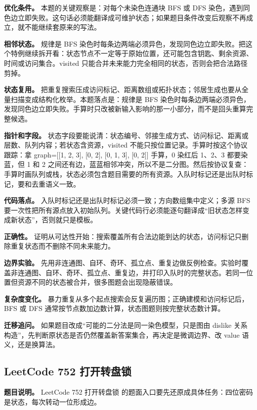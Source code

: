 \textbf{优化条件。} 本题的关键观察是：对每个未染色连通块 BFS 或 DFS 染色，遇到同色边立即失败。这句话必须能翻译成可维护状态；如果题目条件改变后观察不再成立，就不能继续套原来的写法。

\textbf{相邻状态。} 规律是 BFS 染色时每条边两端必须异色，发现同色边立即失败。把这个特例继续拆开看：状态节点不一定等于原始位置，还可能包含钥匙、剩余资源、时间或访问集合。visited 只能合并未来能力完全相同的状态，否则会把合法路径剪掉。

\textbf{状态复用。} 把重复搜索压成访问标记、距离数组或拓扑状态；邻居生成也要从全量扫描变成结构化枚举。本题落点是：规律是 BFS 染色时每条边两端必须异色，发现同色边立即失败。手算时只改被新输入影响的那一小部分，而不是回头重算完整候选。

\textbf{指针和字段。} 状态字段要能说清：状态编号、邻接生成方式、访问标记、距离或层数、队列内容；若状态含资源，visited 不能只按位置记录。手算时按这个协议跟踪：拿 graph=[[1, 2, 3], [0, 2], [0, 1, 3], [0, 2]] 手算，0 染红后 1、2、3 都要染蓝，但 1 和 2 之间还有边，蓝蓝相邻冲突，所以不是二分图。然后按协议复查：手算时画队列或栈，状态必须包含题目需要的所有资源。入队时标记还是出队时标记，要和去重语义一致。

\textbf{代码落点。} 入队时标记还是出队时标记必须一致；方向数组集中定义；多源 BFS 要一次性把所有源点放入初始队列。关键代码行必须能逐句翻译成“旧状态怎样变成新状态”，否则就只是模板。

\textbf{正确性。} 证明从可达性开始：搜索覆盖所有合法边能到达的状态，访问标记只删除重复状态而不删除不同未来能力。

\textbf{边界实验。} 先用非连通图、自环、奇环、孤立点、重复边做反例检查。实验时覆盖非连通图、自环、奇环、孤立点、重复边，并打印入队时的完整状态。若同一位置但资源不同的状态被合并，很多图题会出现隐蔽错误。

\textbf{复杂度变化。} 暴力重复从多个起点搜索会反复遍历图；正确建模和访问标记后，BFS 或 DFS 通常按节点数加边数计算，状态图题则按完整状态数计算。

\textbf{迁移追问。} 如果题目改成“可能的二分法是同一染色模型，只是图由 dislike 关系构造”，先判断原状态是否仍然覆盖新答案集合，再决定是微调边界、改 value 语义，还是换算法。

\subsection{LeetCode 752 打开转盘锁}

\textbf{题目说明。} LeetCode 752 打开转盘锁 的题面入口要先还原成具体任务：四位密码是状态，每次转动一位形成边。

